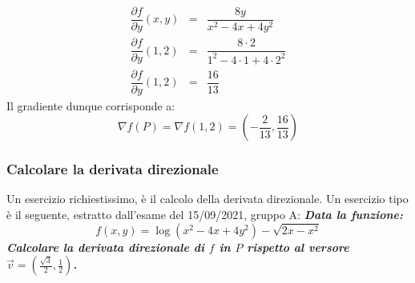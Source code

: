 \documentclass[a4paper]{article}
\begin{document}
	\begin{equation*}
		\begin{array}{rcl}
			\dfrac{\partial f}{\partial y}\left(x,y\right) &=& \dfrac{8y}{x^{2} - 4x + 4y^{2}} \\ [1.5em]
			\dfrac{\partial f}{\partial y}\left(1,2\right) &=& \dfrac{8 \cdot 2}{1^{2} - 4 \cdot 1 + 4 \cdot 2^{2}} \\ [1.5em]
			\dfrac{\partial f}{\partial y}\left(1,2\right) &=& \dfrac{16}{13}
		\end{array}
	\end{equation*}
	Il gradiente dunque corrisponde a:
	\begin{equation*}
		\nabla f\left(P\right) = \nabla f\left(1,2\right) = \left(-\dfrac{2}{13}, \dfrac{16}{13}\right)
	\end{equation*}\newpage

	\subsubsection{Calcolare la derivata direzionale}

	Un esercizio richiestissimo, è il calcolo della derivata direzionale. Un esercizio tipo è il seguente, estratto dall'esame del 15/09/2021, gruppo A: \textcolor{Green4}{\textbf{\emph{Data la funzione:}}
	\begin{equation*}
		f\left(x,y\right) = \log\left(x^{2} -4x + 4y^{2}\right) - \sqrt{2x - x^{2}}
	\end{equation*}
	\textbf{\emph{Calcolare la derivata direzionale di $f$ in $P$ rispetto al versore $\overrightarrow{v} = \left(\frac{\sqrt{3}}{2}, \frac{1}{2}\right)$.}}}\newline
\end{document}
